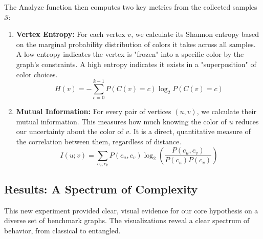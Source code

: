 \documentclass[12pt, letterpaper]{article}
\begin{document}
The Analyze function then computes two key metrics from the collected samples $\mathcal{S}$:
\begin{enumerate}
    \item \textbf{Vertex Entropy:} For each vertex $v$, we calculate its Shannon entropy based on the marginal probability distribution of colors it takes across all samples. A low entropy indicates the vertex is "frozen" into a specific color by the graph's constraints. A high entropy indicates it exists in a "superposition" of color choices.
    $$ H(v) = -\sum_{c=0}^{k-1} P(C(v)=c) \log_2 P(C(v)=c) $$
    \item \textbf{Mutual Information:} For every pair of vertices $(u, v)$, we calculate their mutual information. This measures how much knowing the color of $u$ reduces our uncertainty about the color of $v$. It is a direct, quantitative measure of the correlation between them, regardless of distance.
    $$ I(u; v) = \sum_{c_u, c_v} P(c_u, c_v) \log_2\left(\frac{P(c_u, c_v)}{P(c_u)P(c_v)}\right) $$
\end{enumerate}

\subsection{Results: A Spectrum of Complexity}
This new experiment provided clear, visual evidence for our core hypothesis on a diverse set of benchmark graphs. The visualizations reveal a clear spectrum of behavior, from classical to entangled.
\end{document}
